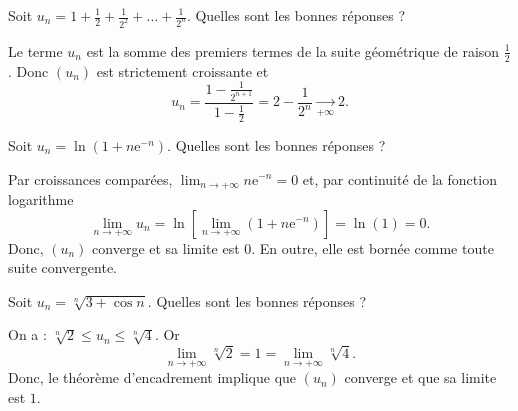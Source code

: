 \begin{question}

Soit $\displaystyle u_n=1+\frac{1}{2}+\frac{1}{2^2}+\dots +\frac{1}{2^n}$. Quelles sont les bonnes réponses ?
\begin{answers}  
\end{answers}
\begin{explanations}
Le terme $u_n$ est la somme des premiers termes de la suite géométrique de raison $\displaystyle \frac{1}{2}$. Donc $(u_n)$ est strictement croissante et
$$u_n=\frac{1-\frac{1}{2^{n+1}}}{1-\frac{1}{2}}=2-\frac{1}{2^n}\underset{+\infty}{\longrightarrow }2.$$
\end{explanations}
\end{question}



\begin{question}

Soit $\displaystyle u_n=\ln \left(1+n\mathrm{e}^{-n}\right)$. Quelles sont les bonnes réponses ?
\begin{answers}
\end{answers}
\begin{explanations}
Par croissances comparées, $\displaystyle \lim _{n\to +\infty}n\mathrm{e}^{-n}=0$ et, par continuité de la fonction logarithme
$$\lim _{n\to +\infty}u_n=\ln \left[\lim _{n\to +\infty}\left(1+n\mathrm{e}^{-n}\right)\right]=\ln (1)=0.$$
Donc, $(u_n)$ converge et sa limite est $0$. En outre, elle est bornée comme toute suite convergente.
\end{explanations}
\end{question}




\begin{question}

Soit $\displaystyle u_n=\sqrt[n]{3+\cos n}$. Quelles sont les bonnes réponses ?
\begin{answers}
\end{answers}
\begin{explanations}
On a : $\displaystyle \sqrt[n]{2}\leq u_n\leq \sqrt[n]{4}$. Or 
$$\lim _{n\to +\infty}\sqrt[n]{2}=1=\lim _{n\to +\infty}\sqrt[n]{4}.$$
Donc, le théorème d'encadrement implique que $(u_n)$ converge et que sa limite est $1$.
\end{explanations}
\end{question}





